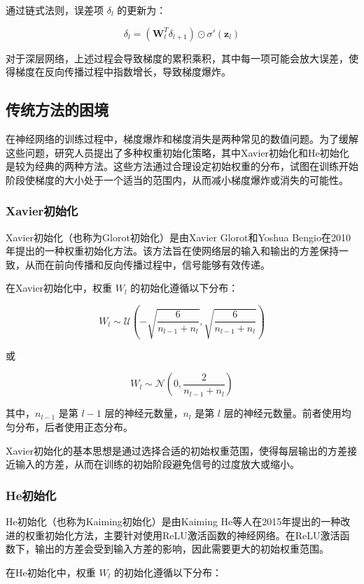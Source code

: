 \documentclass[12pt,a4paper]{amsart}
\begin{document}
通过链式法则，误差项 \(\delta_l\) 的更新为：

\[ \delta_l = (\mathbf{W}_l^T \delta_{l+1}) \odot \sigma'(\mathbf{z}_l) \]

对于深层网络，上述过程会导致梯度的累积乘积，其中每一项可能会放大误差，使得梯度在反向传播过程中指数增长，导致梯度爆炸。

\subsection{传统方法的困境}

在神经网络的训练过程中，梯度爆炸和梯度消失是两种常见的数值问题。为了缓解这些问题，研究人员提出了多种权重初始化策略，其中Xavier初始化和He初始化是较为经典的两种方法。这些方法通过合理设定初始权重的分布，试图在训练开始阶段使梯度的大小处于一个适当的范围内，从而减小梯度爆炸或消失的可能性。

\subsubsection{Xavier初始化}

Xavier初始化（也称为Glorot初始化）是由Xavier Glorot和Yoshua Bengio在2010年提出的一种权重初始化方法。该方法旨在使网络层的输入和输出的方差保持一致，从而在前向传播和反向传播过程中，信号能够有效传递。

在Xavier初始化中，权重 \( W_l \) 的初始化遵循以下分布：

\[ W_l \sim \mathcal{U}\left(-\sqrt{\frac{6}{n_{l-1} + n_l}}, \sqrt{\frac{6}{n_{l-1} + n_l}}\right) \]

或

\[ W_l \sim \mathcal{N}\left(0, \frac{2}{n_{l-1} + n_l}\right) \]

其中，\( n_{l-1} \) 是第 \( l-1 \) 层的神经元数量，\( n_l \) 是第 \( l \) 层的神经元数量。前者使用均匀分布，后者使用正态分布。

Xavier初始化的基本思想是通过选择合适的初始权重范围，使得每层输出的方差接近输入的方差，从而在训练的初始阶段避免信号的过度放大或缩小。

\subsubsection{He初始化}

He初始化（也称为Kaiming初始化）是由Kaiming He等人在2015年提出的一种改进的权重初始化方法，主要针对使用ReLU激活函数的神经网络。在ReLU激活函数下，输出的方差会受到输入方差的影响，因此需要更大的初始权重范围。

在He初始化中，权重 \( W_l \) 的初始化遵循以下分布：
\end{document}
